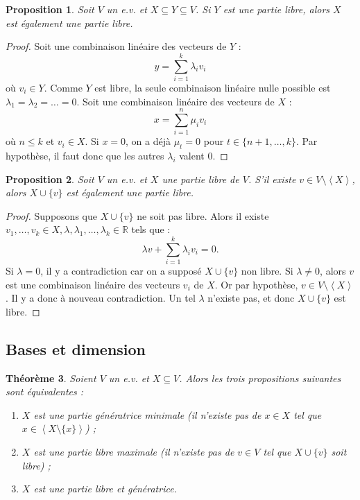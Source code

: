 \documentclass{article}
\newcommand{\R}{\mathbb R}
\newcommand{\eng}[1]{\left\langle#1\right\rangle}
\newtheorem{thm}{Théorème}[section]
\newtheorem{prp}[thm]{Proposition}
\theoremstyle{definition}
\theoremstyle{remark}
\begin{document}
		\begin{prp} Soit $V$ un e.v. et $X \subseteq Y \subseteq V$. Si $Y$ est une partie libre, alors $X$ est également une partie libre. \end{prp}

		\begin{proof} Soit une combinaison linéaire des vecteurs de $Y$ : \[y = \sum_{i=1}^k\lambda_iv_i\] où $v_i \in Y$. Comme $Y$ est libre, la seule combinaison linéaire
		nulle possible est $\lambda_1 = \lambda_2 = \ldots = 0$. Soit une combinaison linéaire des vecteurs de $X$ : \[x = \sum_{i=1}^n\mu_iv_i\] où $n \leq k$ et $v_i \in X$.
		Si $x = 0$, on a déjà $\mu_t = 0$ pour $t \in \{n+1, \ldots, k\}$. Par hypothèse, il faut donc que les autres $\lambda_i$ valent $0$. \end{proof}

		\begin{prp}\label{ajoutPartieLibre} Soit $V$ un e.v. et $X$ une partie libre de $V$. S'il existe $v \in V \setminus \eng X$, alors $X \cup \{v\}$ est
		également une partie libre. \end{prp}

		\begin{proof} Supposons que $X \cup \{v\}$ ne soit pas libre. Alors il existe $v_1, \ldots, v_k \in X, \lambda, \lambda_1, \ldots, \lambda_k \in \R$ tels que :
		\[\lambda v + \sum_{i=1}^k\lambda_iv_i = 0.\] Si $\lambda = 0$, il y a contradiction car on a supposé $X \cup \{v\}$ non libre. Si $\lambda \neq 0$, alors $v$ est une
		combinaison linéaire des vecteurs $v_i$ de $X$. Or par hypothèse, $v \in V \setminus \eng X$. Il y a donc à nouveau contradiction. Un tel $\lambda$ n'existe pas, et
		donc $X \cup \{v\}$ est libre. \end{proof}

	\subsection{Bases et dimension}
		\begin{thm}\label{equivBases} Soient $V$ un e.v. et $X \subseteq V$. Alors les trois propositions suivantes sont équivalentes :
		\begin{enumerate}
			\item $X$ est une partie génératrice minimale (il n'existe pas de $x \in X$ tel que $x \in \eng {X \setminus \{x\}}$) ;
			\item $X$ est une partie libre maximale (il n'existe pas de $v \in V$ tel que $X \cup \{v\}$ soit libre) ;
			\item $X$ est une partie libre et génératrice.
		\end{enumerate}
		\end{thm}
\end{document}
